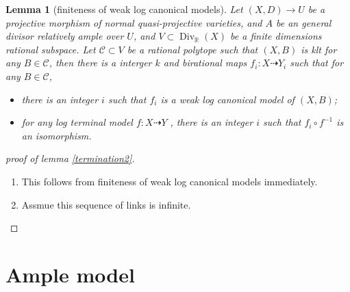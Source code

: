 \documentclass{article}
\newtheorem{lem}[defn]{Lemma}
\begin{document}
\begin{lem}[finiteness of weak log canonical models]\label{finitewlcm}
  Let $(X,D)\to U$ be a projective morphism of normal quasi-projective varieties, and $A$ be an general divisor relatively ample over $U$, and $V \subset \operatorname{Div}_{\mathbb{R}}(X)$ be a finite dimensions rational subspace. Let $\mathcal{C} \subset V$ be a rational polytope such that $(X,B)$ is klt for any $B \in \mathcal{C}$, then there is a interger $k$ and birational maps $f_i:X \dashrightarrow Y_{i}$ such that for any $B \in \mathcal{C}$, 
  \begin{itemize}
    \item  there is an integer $i$ such that $ f_i$ is a weak log canonical model of $(X,B)$;
    \item for any log terminal model $f:X\dashrightarrow Y$ , there is an integer $i$ such that $f_i\circ f^{-1}$ is an isomorphism.
  \end{itemize}
\end{lem}

\begin{proof}[proof of lemma \ref{termination2}]
\begin{enumerate}
  \item This follows from finiteness of weak log canonical models immediately.
  \item Assmue this sequence of links is infinite.
\end{enumerate}  
\end{proof}

\section{Ample model}
\end{document}
